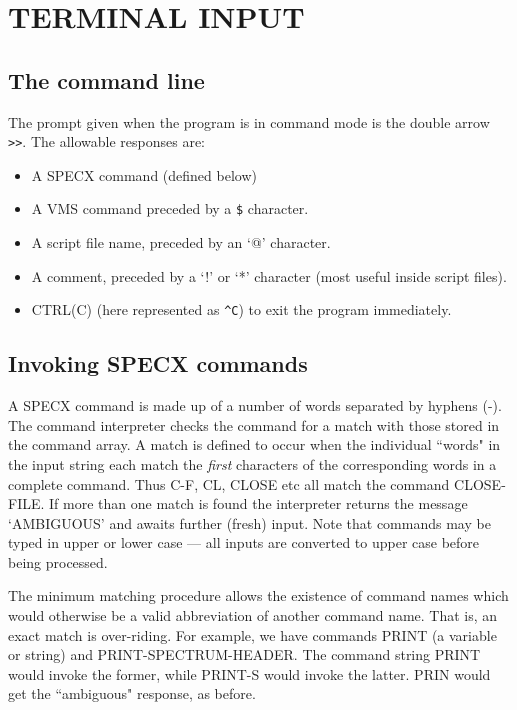\documentclass[11pt,twoside]{report}
\begin{document}
\section{TERMINAL INPUT}

\subsection{The command line}
The prompt given when the program is in command mode is the double arrow
\verb+>>+. 
The allowable responses are:
\begin{itemize}
\item 
A SPECX command (defined below)
\item 
A VMS command preceded by a \verb+$+ character.
\item 	
A script file name, preceded by an `@' character.
\item 
A comment, preceded by a `!' or `*' character (most
useful inside script files).
\item 
CTRL(C) (here represented as \verb+^C+) to exit the
program immediately.
\end{itemize}

\subsection{Invoking SPECX commands}

A SPECX command is made up of a number of words
separated by hyphens (-). The command interpreter checks the command for a match with those stored in the
command array. A match is defined to occur when the individual
``words" in the input string each match the {\em first} characters of
the corresponding words in a complete command. Thus C-F, CL, CLOSE etc
all match the command CLOSE-FILE. If more than one match is found the
interpreter returns the message `AMBIGUOUS'
and awaits further (fresh) input. Note that commands may be typed in
upper or lower case --- all
inputs are converted to upper case before being processed.

The minimum matching procedure allows the
existence of command names which would otherwise be a valid
abbreviation of another command name.  That is, an exact match is
over-riding. For example, we have commands PRINT (a variable or
string) and PRINT-SPECTRUM-HEADER. The command string PRINT would
invoke the former, while PRINT-S would invoke the latter. PRIN would
get the ``ambiguous" response, as before.
\end{document}
